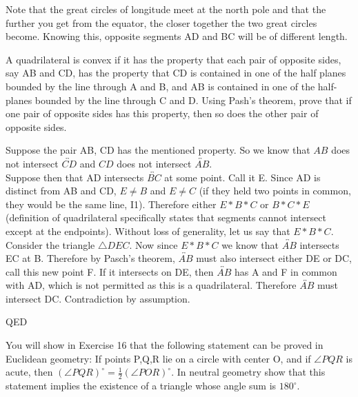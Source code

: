 \documentclass[12pt,letterpaper]{article}
\newcommand{\Proof}{\noindent {\bf Proof: }}
\newcommand{\QED}{\begin{flushright}QED\end{flushright}}
\newcommand{\prob}[1]{\newpage\noindent {\bf #1}}
\begin{document}
Note that the great circles of longitude meet at the north pole and that the further you get from the equator, the closer together the two great circles become.  Knowing this, opposite segments AD and BC will be of different length. 


\prob{28} A quadrilateral is convex if it has the property that each pair of opposite sides, say AB and CD, has the property that CD is contained in one of the half planes bounded by the line through A and B, and AB is contained in one of the half-planes bounded by the line through C and D.  Using Pash's theorem, prove that if one pair of opposite sides has this property, then so does the other pair of opposite sides. \\

\Proof

Suppose the pair AB, CD has the mentioned property.  So we know that $AB$ does not intersect $\overleftrightarrow{CD}$ and $CD$ does not intersect $\overleftrightarrow{AB}$.  \\

Suppose then that AD intersects $\overleftrightarrow{BC}$ at some point.  Call it E.  Since AD is distinct from AB and CD, $E\neq B$ and $E\neq C$ (if they held two points in common, they would be the same line, I1).  Therefore either $E*B*C$ or $B*C*E$ (definition of quadrilateral specifically states that segments cannot intersect except at the endpoints). Without loss of generality, let us say that $E*B*C$. \\ 

Consider the triangle $\triangle DEC$. Now since $E*B*C$ we know that $\overleftrightarrow{AB}$ intersects EC at B.  Therefore by Pasch's theorem, $\overleftrightarrow{AB}$ must also intersect either DE or DC, call this new point F.  If it intersects on DE, then $\overleftrightarrow{AB}$ has A and F in common with AD, which is not permitted as this is a quadrilateral.   Therefore $\overleftrightarrow{AB}$ must intersect DC.  Contradiction by assumption. \\


\QED





\prob{9}  You will show in Exercise 16 that the following statement can be proved in Euclidean geometry:  If points P,Q,R lie on a circle with center O, and if $\angle PQR$ is acute, then $(\angle PQR)^\circ = \frac{1}{2} (\angle POR)^\circ$.  In neutral geometry show that this statement implies the existence of a triangle whose angle sum is $180^\circ$.
\end{document}
